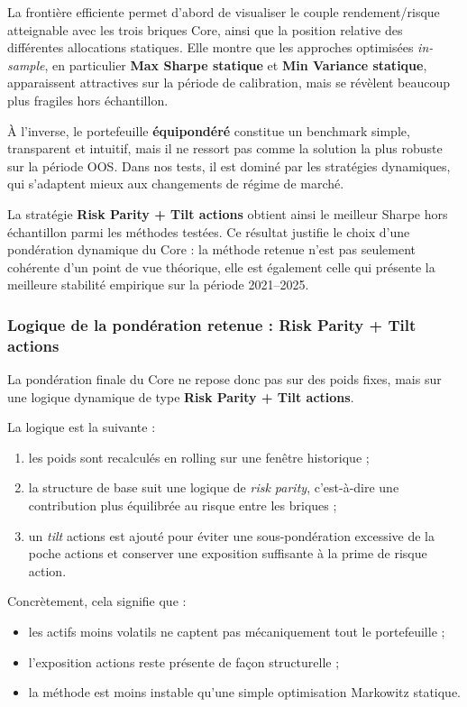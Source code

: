 \documentclass{article}
\begin{document}
La frontière efficiente permet d’abord de visualiser le couple rendement/risque atteignable avec les trois briques Core, ainsi que la position relative des différentes allocations statiques. Elle montre que les approches optimisées \textit{in-sample}, en particulier \textbf{Max Sharpe statique} et \textbf{Min Variance statique}, apparaissent attractives sur la période de calibration, mais se révèlent beaucoup plus fragiles hors échantillon.

À l’inverse, le portefeuille \textbf{équipondéré} constitue un benchmark simple, transparent et intuitif, mais il ne ressort pas comme la solution la plus robuste sur la période OOS. Dans nos tests, il est dominé par les stratégies dynamiques, qui s’adaptent mieux aux changements de régime de marché.

La stratégie \textbf{Risk Parity + Tilt actions} obtient ainsi le meilleur Sharpe hors échantillon parmi les méthodes testées. Ce résultat justifie le choix d’une pondération dynamique du Core : la méthode retenue n’est pas seulement cohérente d’un point de vue théorique, elle est également celle qui présente la meilleure stabilité empirique sur la période 2021--2025.
\subsubsection{Logique de la pondération retenue : Risk Parity + Tilt actions}

La pondération finale du Core ne repose donc pas sur des poids fixes, mais sur une logique dynamique de type \textbf{Risk Parity + Tilt actions}.

La logique est la suivante :
\begin{enumerate}
    \item les poids sont recalculés en rolling sur une fenêtre historique ;
    \item la structure de base suit une logique de \textit{risk parity}, c’est-à-dire une contribution plus équilibrée au risque entre les briques ;
    \item un \textit{tilt} actions est ajouté pour éviter une sous-pondération excessive de la poche actions et conserver une exposition suffisante à la prime de risque action.
\end{enumerate}

Concrètement, cela signifie que :
\begin{itemize}
    \item les actifs moins volatils ne captent pas mécaniquement tout le portefeuille ;
    \item l’exposition actions reste présente de façon structurelle ;
    \item la méthode est moins instable qu’une simple optimisation Markowitz statique.
\end{itemize}
\end{document}
